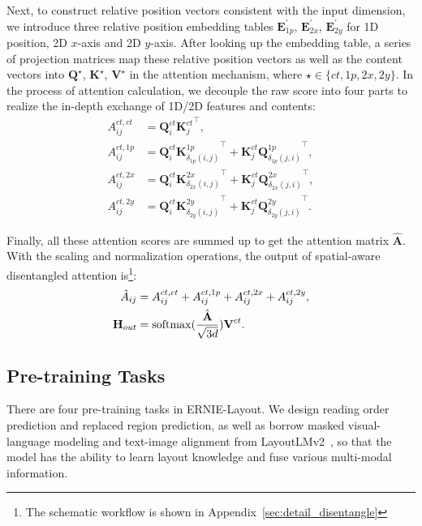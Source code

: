 \documentclass[11pt]{article}
\begin{document}
Next, to construct relative position vectors consistent with the input dimension, we introduce three relative position embedding tables $\textbf{E}_{1p}^{'}$, $\textbf{E}_{2x}^{'}$, $\textbf{E}_{2y}^{'}$ for 1D position, 2D $x$-axis and 2D $y$-axis.
After looking up the embedding table, a series of projection matrices map these relative position vectors as well as the content vectors into $\textbf{Q}^{\star}$, $\textbf{K}^{\star}$, $\textbf{V}^{\star}$ in the attention mechanism, where $\star \in \{{ct, 1p, 2x, 2y}\}$.
In the process of attention calculation, we decouple the raw score into four parts to realize the in-depth exchange of 1D/2D features and contents:
%
\begin{align}
    {A}_{ij}^{ct,ct} &= \textbf{Q}^{ct}_{i} {\textbf{K}^{ct}_{j}}^{\top}, \\
    {A}_{ij}^{ct,1p} &= \textbf{Q}^{ct}_{i}{\textbf{K}^{1p}_{\delta_{1p}(i,j)}}^{\top} + \textbf{K}^{ct}_{j}{\textbf{Q}^{1p}_{\delta_{1p}(j,i)}}^{\top}, \\
    {A}_{ij}^{ct,2x} &= \textbf{Q}^{ct}_{i}{\textbf{K}^{2x}_{\delta_{2x}(i,j)}}^{\top} + \textbf{K}^{ct}_{j}{\textbf{Q}^{2x}_{\delta_{2x}(j,i)}}^{\top}, \\
    {A}_{ij}^{ct,2y} &= \textbf{Q}^{ct}_{i}{\textbf{K}^{2y}_{\delta_{2y}(i,j)}}^{\top} + \textbf{K}^{ct}_{j}{\textbf{Q}^{2y}_{\delta_{2y}(j,i)}}^{\top}.
\end{align}

Finally, all these attention scores are summed up to get the attention matrix $\hat{\textbf{A}}$. With the scaling and normalization operations, the output of spatial-aware disentangled attention is\footnote{The schematic workflow is shown in
Appendix~\ref{sec:detail_disentangle}}:
% 
\begin{align}
    \hat{A}_{ij} &= {A}_{ij}^{ct,ct} + {A}_{ij}^{ct,1p} + {A}_{ij}^{ct,2x} + {A}_{ij}^{ct,2y}, \\
    \textbf{H}_{out} &= {\rm softmax}(\frac{\hat{\textbf{A}}}{\sqrt{3d}}) \textbf{V}^{ct}.
\end{align}

\subsection{Pre-training Tasks}

There are four pre-training tasks in ERNIE-Layout.
We design reading order prediction and replaced region prediction, as well as borrow masked visual-language modeling and text-image alignment from LayoutLMv2~\cite{xu2021layoutlmv2}, so that the model has the ability to learn layout knowledge and fuse various multi-modal information.
\end{document}
